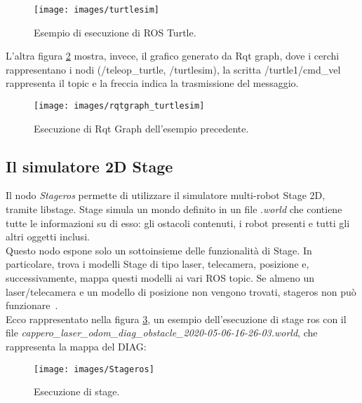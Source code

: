 \begin{figure}[h]
	\centering
	\texttt{[image: images/turtlesim]}
	\caption{Esempio di esecuzione di ROS Turtle.}
	\label{fig:turtlesim}
\end{figure}

L'altra figura \ref{fig:rqtgraphturtlesim} mostra, invece, il grafico generato da Rqt graph, dove i cerchi rappresentano i nodi (/teleop\_turtle, /turtlesim), la scritta /turtle1/cmd\_vel rappresenta il topic e la freccia indica la trasmissione del messaggio.

\begin{figure}[h!]
	\centering
	\texttt{[image: images/rqtgraph\_turtlesim]}
	\caption{Esecuzione di Rqt Graph dell'esempio precedente.}
	\label{fig:rqtgraphturtlesim}
\end{figure}


\subsection{Il simulatore 2D Stage}
Il nodo \textit{Stageros} permette di utilizzare il simulatore multi-robot Stage 2D, tramite libstage. Stage simula un mondo definito in un file .\textit{world} che contiene tutte le informazioni su di esso: gli ostacoli contenuti, i robot presenti e tutti gli altri oggetti inclusi.\\
Questo nodo espone solo un sottoinsieme delle funzionalità di Stage. In particolare, trova i modelli Stage di tipo laser, telecamera, posizione e, successivamente, mappa questi modelli ai vari ROS topic. Se almeno un laser/telecamera e un modello di posizione non vengono trovati, stageros non può funzionare~\cite{27}.\\
Ecco rappresentato nella figura \ref{fig:stageros}, un esempio dell'esecuzione di stage ros con il file \textit{cappero\_laser\_odom\_diag\_obstacle\_2020-05-06-16-26-03.world}, che rappresenta la mappa del DIAG:\\
\begin{figure}[h]
	\centering
	\texttt{[image: images/Stageros]}
	\caption{Esecuzione di stage.}
	\label{fig:stageros}
\end{figure}


